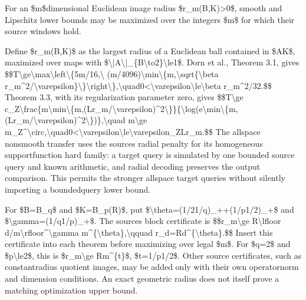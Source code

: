 \documentclass[10pt,a4paper]{article}
\begin{document}
For an \$m\$dimensional Euclidean image radius \$r\_m(B,K)>0\$, smooth and Lipschitz lower bounds may be maximized over the integers \$m\$ for which their source windows hold.

Define \$r\_m(B,K)\$ as the largest radius of a Euclidean ball contained in \$AK\$, maximized over maps with \$\textbackslash{}|A\textbackslash{}|\_\{B\textbackslash{}to2\}\textbackslash{}le1\$. Dorn et al., Theorem 3.1, gives
\$\$T\textbackslash{}ge\textbackslash{}max\textbackslash{}left\textbackslash{}\{5m/16,\textbackslash{} (m/4096)\textbackslash{}min\textbackslash{}\{m,\textbackslash{}sqrt\{\textbackslash{}beta r\_m\textasciicircum{}2/\textbackslash{}varepsilon\}\textbackslash{}\}\textbackslash{}rig\allowbreak{}ht\textbackslash{}\},\textbackslash{}quad0<\textbackslash{}varepsilon\textbackslash{}\allowbreak{}le\textbackslash{}beta r\_m\textasciicircum{}2/32.\$\$
Theorem 3.3, with its regularization parameter zero, gives
\$\$T\textbackslash{}ge c\_Z\textbackslash{}frac\{m\textbackslash{}min\textbackslash{}\{m,(Lr\_m/\allowbreak{}\textbackslash{}varepsilon)\textasciicircum{}2\textbackslash{}\}\}\{\textbackslash{}log(e\allowbreak{}\textbackslash{}min\textbackslash{}\{m,(Lr\_m/\textbackslash{}varepsilo\allowbreak{}n)\textasciicircum{}2\textbackslash{}\})\},\textbackslash{}quad m\textbackslash{}ge m\_Z\textasciicircum{}\textbackslash{}circ,\textbackslash{}quad0<\textbackslash{}vareps\allowbreak{}ilon\textbackslash{}le\textbackslash{}varepsilon\_ZLr\_m\allowbreak{}.\$\$
The allspace nonsmooth transfer uses the sources radial penalty for its homogeneous supportfunction hard family: a target query is simulated by one bounded source query and known arithmetic, and radial decoding preserves the output comparison. This permits the stronger allspace target queries without silently importing a boundedquery lower bound.

For \$B=B\_q\$ and \$K=B\_p(R)\$, put \$\textbackslash{}theta=(1/21/q)\_++(1/p1/2)\_+\$ and \$\textbackslash{}gamma=(1/q1/p)\_+\$. The sources block certificate is
\$\$r\_m\textbackslash{}ge R\textbackslash{}lfloor d/m\textbackslash{}rfloor\textasciicircum{}\textbackslash{}gamma m\textasciicircum{}\{\textbackslash{}theta\},\textbackslash{}qquad r\_d=Rd\textasciicircum{}\{\textbackslash{}theta\}.\$\$
Insert this certificate into each theorem before maximizing over legal \$m\$. For \$q=2\$ and \$p\textbackslash{}le2\$, this is \$r\_m\textbackslash{}ge Rm\textasciicircum{}\{t\}\$, \$t=1/p1/2\$. Other source certificates, such as constantradius quotient images, may be added only with their own operatornorm and dimension conditions. An exact geometric radius does not itself prove a matching optimization upper bound.
\end{document}
